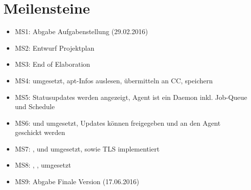 \section*{Meilensteine}

\begin{itemize}
    \item MS1: Abgabe Aufgabenstellung (29.02.2016)
    \item MS2: Entwurf Projektplan
    \item MS3: End of Elaboration
    \item MS4:  umgesetzt, apt-Infos auslesen, übermitteln an CC, speichern
    \item MS5: Statusupdates werden angezeigt, Agent ist ein Daemon inkl. Job-Queue und Schedule
    \item MS6:  und  umgesetzt, Updates können freigegeben und an den Agent geschickt werden
    \item MS7: ,  und  umgesetzt, sowie TLS implementiert
    \item MS8: , ,  umgesetzt
    \item MS9: Abgabe Finale Version (17.06.2016)
\end{itemize}